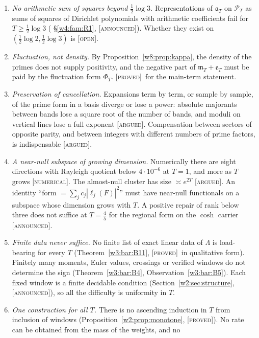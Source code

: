 \documentclass[11pt]{amsart}
\theoremstyle{definition}
\theoremstyle{remark}
\numberwithin{equation}{section}
\newcommand{\PT}{\mathcal{P}_T}                        %
\newcommand{\mT}{\mathfrak{m}_T}                       %
\newcommand{\aT}{\mathfrak{a}_T}                       %
\newcommand{\stag}[1]{\textsc{[#1]}}
\newcommand{\PROVED}{\stag{proved}}
\newcommand{\ARGUED}{\stag{argued}}
\newcommand{\NUM}{\stag{numerical}}
\newcommand{\OPENQ}{\stag{open}}
\newcommand{\ANNOUNCED}{\stag{announced}}
\begin{document}
\begin{enumerate}[label=\textbf{C\arabic*.},ref=C\arabic*,leftmargin=*]
every positive weight cannot equal $\aT$ (Observation~\ref{w3:bar:B10}; (i)--(iii) \ANNOUNCED, (iv) \ARGUED). An
auxiliary positive object is admissible only if its exact identity with the form is proved.
\item\label{w8:con:sos} \emph{No arithmetic sum of squares beyond $\frac12\log3$.} Representations of $\aT$ on $\PT$ as
sums of squares of Dirichlet polynomials with arithmetic coefficients fail for $T\ge\frac12\log3$ (
\S\ref{w4:fam:R1}, \ANNOUNCED). Whether they exist on $(\frac12\log2,\frac12\log3)$ is \OPENQ.
\item\label{w8:con:fluct} \emph{Fluctuation, not density.} By Proposition~\ref{w8:prop:kappa}, the density of the
primes does not supply positivity, and the negative part of $\mT+\mathfrak e_T$ must be paid by the fluctuation form $\Phi_T$. \PROVED\ for the main-term
statement.
\item\label{w8:con:cancel} \emph{Preservation of cancellation.} Expansions term by term, or sample by sample, of the
prime form in a basis diverge or lose a power: absolute majorants between bands lose a square root of the number of
bands, and moduli on vertical lines lose a full exponent \ARGUED. Compensation between sectors of opposite parity, and
between integers with different numbers of prime factors, is indispensable \ARGUED.
\item\label{w8:con:nearnull} \emph{A near-null subspace of growing dimension.} Numerically there are eight directions
with Rayleigh quotient below $4\cdot10^{-6}$ at $T=1$, and more as $T$ grows \NUM. The almost-null cluster has size
$\asymp e^{2T}$ \ARGUED. An identity ``form $=\sum_j c_j|\ell_j(F)|^2$'' must have near-null functionals on a subspace
whose dimension grows with $T$. A positive repair of rank below three does not suffice at $T=\frac45$ for the regional
form on the $\cosh$ carrier \ANNOUNCED.
\item\label{w8:con:finite} \emph{Finite data never suffice.} No finite list of exact linear data of $\Lambda$ is
load-bearing for every $T$ (Theorem~\ref{w3:bar:B11}, \PROVED\ in qualitative form). Finitely many moments, Euler
values, crossings or verified windows do not determine the sign (Theorem~\ref{w3:bar:B4},
Observation~\ref{w3:bar:B5}). Each fixed window is a finite decidable condition (Section~\ref{w2:sec:structure},
\ANNOUNCED), so all the difficulty is uniformity in $T$.
\item\label{w8:con:uniform} \emph{One construction for all $T$.} There is no ascending induction in $T$ from inclusion
of windows (Proposition~\ref{w2:prop:monotone}, \PROVED). No rate can be obtained from the mass of the weights, and no

\end{enumerate}
\end{document}
